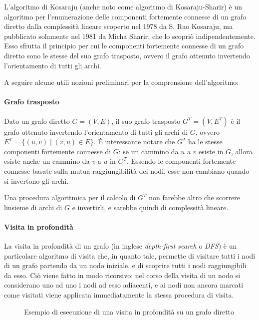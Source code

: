 L'algoritmo di Kosaraju (anche noto come algoritmo di Kosaraju-Sharir) \`e un algoritmo per l'enumerazione
delle componenti fortemente connesse di un grafo diretto dalla complessit\`a lineare scoperto nel 1978 da S. Rao
Kosaraju, ma pubblicato solamente nel 1981 da Micha Sharir, che lo scopri\`o indipendentemente.
Esso sfrutta il principio per cui le componenti fortemente connesse di un grafo diretto sono le stesse del suo grafo
trasposto, ovvero il grafo ottenuto invertendo l'orientamento di tutti gli archi. \newline

A seguire alcune utili nozioni preliminari per la comprensione dell'algoritmo:

\paragraph{Grafo trasposto}
Dato un grafo diretto $G = (V, E)$, il suo grafo trasposto $G^T = (V, E^T)$ \`e il grafo ottenuto invertendo
l'orientamento di tutti gli archi di $G$, ovvero $E^T = \{(u, v) \mid (v, u) \in E\}$.
 \'E interessante notare che $G^T$ ha le stesse componenti fortemente connesse di $G$: se un cammino da $u$ a $v$
esiste in $G$, allora esiste anche un cammino da $v$ a $u$ in $G^T$.
Essendo le componenti fortemente connesse basate sulla mutua raggiungibilit\`a dei nodi, esse non cambiano
quando si invertono gli archi.

Una procedura algoritmica per il calcolo di $G^T$ non farebbe altro che scorrere linsieme di archi di $G$ e
invertirli, e sarebbe quindi di complessit\`a lineare.

\paragraph{Visita in profondit\`a}
La visita in profondit\`a di un grafo (in inglese \textit{depth-first search} o \textit{DFS}) \`e un particolare
algoritmo di visita che, in quanto tale, permette di visitare tutti i nodi di un grafo partendo da un nodo iniziale,
e di scoprire tutti i nodi raggiungibili da esso.
Ci\`o viene fatto in modo ricorsivo: nel corso della visita di un nodo si considerano uno ad uno i nodi ad esso
adiacenti, e ai nodi non ancora marcati come visitati viene applicata immediatamente la stessa procedura di visita.




\begin{figure}
    
    \caption{Esempio di esecuzione di una visita in profondit\`a su un grafo diretto}
    \label{fig:dfs-example}
\end{figure}

